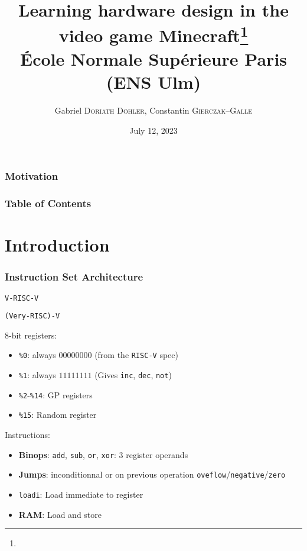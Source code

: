 \documentclass{beamer}
\title{Learning hardware design in the video game Minecraft\footnote{\tiny{}\reproduce}\\\small{} École Normale Supérieure Paris (ENS Ulm)}
\author{Gabriel \textsc{Doriath Döhler}, Constantin \textsc{Gierczak--Galle}}
\date{July 12, 2023}
\newcommand{\rv}{\texttt{RISC-V}}
\newcommand{\vrv}{\texttt{V-\rv}}
\begin{document}
\beamertemplatenavigationsymbolsempty
{}

\maketitle

\begin{frame}[fragile]
	\frametitle{Motivation}

\end{frame}

\begin{frame}[fragile]
	\frametitle{Table of Contents}
	\tableofcontents
\end{frame}

\section{Introduction}



\begin{frame}
	\frametitle{Instruction Set Architecture}
	\vrv

	\texttt{(Very-RISC)-V}

	$8$-bit registers:

	\begin{itemize}
		\item \texttt{\%0}: always $00000000$ (from the \rv{} spec)
		\item \texttt{\%1}: always $11111111$ (Gives \texttt{inc},
		      \texttt{dec}, \texttt{not})
		\item \texttt{\%2}-\texttt{\%14}: GP registers
		\item \texttt{\%15}: Random register
	\end{itemize}

	Instructions:
	\begin{itemize}
		\item \textbf{Binops}: \texttt{add}, \texttt{sub}, \texttt{or},
		      \texttt{xor}: $3$ register operands
		\item \textbf{Jumps}: inconditionnal or on previous operation
		      \texttt{oveflow}/\texttt{negative}/\texttt{zero}
		\item \texttt{loadi}: Load immediate to register
		\item \textbf{RAM}: Load and store
	\end{itemize}
\end{frame}
\end{document}
